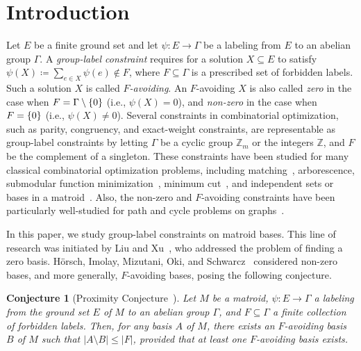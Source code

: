 \documentclass{article}
\DeclarePairedDelimiter{\set}{\{}{\}}
\newtheorem{conjecture}[theorem]{Conjecture}
\theoremstyle{definition}
\newcommand{\Z}{\mathbb{Z}}
\begin{document}
\section{Introduction}

Let $E$ be a finite ground set and let $\psi\colon E \to \Gamma$ be a labeling from $E$ to an abelian group $\Gamma$.
A \emph{group-label constraint} requires for a solution $X \subseteq E$ to satisfy $\psi(X) \coloneqq \sum_{e \in X} \psi(e) \notin F$, where $F\subseteq \Gamma$ is a prescribed set of forbidden labels.
Such a solution $X$ is called \emph{$F$-avoiding}.
An $F$-avoiding $X$ is also called \emph{zero} in the case when $F = \Gamma \setminus \set{0}$ (i.e., $\psi(X) = 0$), and \emph{non-zero} in the case when $F = \set{0}$ (i.e., $\psi(X) \ne 0$).
Several constraints in combinatorial optimization, such as parity, congruency, and exact-weight constraints, are representable as group-label constraints by letting $\Gamma$ be a cyclic group $\Z_m$ or the integers $\Z$, and $F$ be the complement of a singleton.
These constraints have been studied for many classical combinatorial optimization problems, including matching~\cite{papadimitriou1982exact,mulmuley1987matching,Artmann2017,elmaalouly2023exact,jia2023exact}, arborescence\cite{barahona1987exact}, submodular function minimization~\cite{goemans1995minimizing,nagele2019submodular}, minimum cut~\cite{nagele2020new}, and independent sets or bases in a matroid~\cite{camerini1992exact,doronarad2024lower,rieder1991lattices}.
Also, the non-zero and $F$-avoiding constraints have been particularly well-studied for path and cycle problems on graphs~\cite{chudnovsky2006apath,chudnovsky2008algorithm,iwata2022finding,kawase2020twoforbidpath,kobayashi2017finding,reed1999mangoes,wollan2010packing,wollan2011packing,thomas2023packing}.

In this paper, we study group-label constraints on matroid bases.
This line of research was initiated by Liu and Xu~\cite{liu2023congruency}, who addressed the problem of finding a zero basis. 
Hörsch, Imolay, Mizutani, Oki, and Schwarcz~\cite{horsch2024problems} considered non-zero bases, and more generally, $F$-avoiding bases, posing the following conjecture.

\begin{conjecture}[{Proximity Conjecture~\cite{horsch2024problems}}]\label{conj:proximity}
  Let $M$ be a matroid, $\psi \colon E \to \Gamma$ a labeling from the ground set $E$ of $M$ to an abelian group $\Gamma$, and $F \subseteq \Gamma$ a finite collection of forbidden labels.
  Then, for any basis $A$ of $M$, there exists an $F$-avoiding basis $B$ of $M$ such that $|A \setminus B| \le |F|$, provided that at least one $F$-avoiding basis exists.
\end{conjecture}
\end{document}
